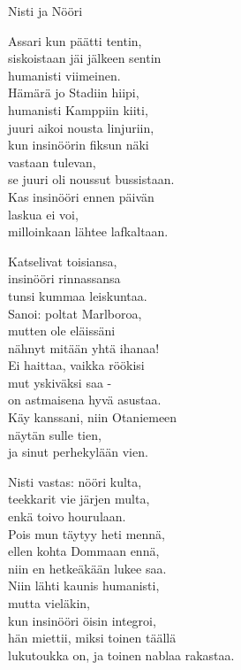 \begin{song}{Nisti ja Nööri}

    Assari kun päätti tentin,\\
    siskoistaan jäi jälkeen sentin\\
    humanisti viimeinen.\\
    Hämärä jo Stadiin hiipi,\\
    humanisti Kamppiin kiiti,\\
    juuri aikoi nousta linjuriin,\\
    kun insinöörin fiksun näki\\
    vastaan tulevan,\\
    se juuri oli noussut bussistaan.\\
    Kas insinööri ennen päivän\\
    laskua ei voi,\\
    milloinkaan lähtee lafkaltaan.

    Katselivat toisiansa,\\
    insinööri rinnassansa\\
    tunsi kummaa leiskuntaa.\\
    Sanoi: poltat Marlboroa,\\
    mutten ole eläissäni\\
    nähnyt mitään yhtä ihanaa!\\
    Ei haittaa, vaikka röökisi\\
    mut yskiväksi saa -\\
    on astmaisena hyvä asustaa.\\
    Käy kanssani, niin Otaniemeen\\
    näytän sulle tien,\\
    ja sinut perhekylään vien.

    Nisti vastas: nööri kulta,\\
    teekkarit vie järjen multa,\\
    enkä toivo hourulaan.\\
    Pois mun täytyy heti mennä,\\
    ellen kohta Dommaan ennä,\\
    niin en hetkeäkään lukee saa.\\
    Niin lähti kaunis humanisti,\\
    mutta vieläkin,\\
    kun insinööri öisin integroi,\\
    hän miettii, miksi toinen täällä\\
    lukutoukka on,
    ja toinen nablaa rakastaa.

\end{song}